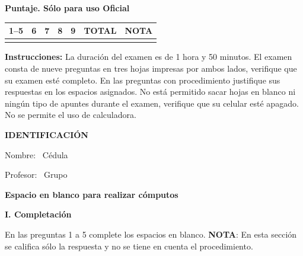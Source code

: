 \documentclass[11pt]{article}
\begin{document}
\examheader

\vspace{4pt}
\noindent
\begin{minipage}[t]{0.62\linewidth}
\textbf{Puntaje. Sólo para uso Oficial}\\[4pt]
\begin{tabular}{|c|c|c|c|c|c|c|}
\hline
1--5 & 6 & 7 & 8 & 9 & \textbf{TOTAL} & \textbf{NOTA} \\ \hline
 & & & & & & \\ \hline
\end{tabular}
\end{minipage}

\vspace{6pt}
\noindent\textbf{Instrucciones:} La duración del examen es de 1 hora y 50 minutos. El examen consta de nueve preguntas en tres hojas impresas por ambos lados, verifique que su examen esté completo. En las preguntas con procedimiento justifique sus respuestas en los espacios asignados. No está permitido sacar hojas en blanco ni ningún tipo de apuntes durante el examen, verifique que su celular esté apagado. No se permite el uso de calculadora.

\vspace{6pt}
\noindent\textbf{IDENTIFICACIÓN}

\vspace{8pt}
\noindent Nombre: \dotfill\ Cédula \dotfill

\vspace{4pt}
\noindent Profesor: \dotfill\ Grupo \dotfill

\vspace{6pt}
\begin{center}
\textbf{Espacio en blanco para realizar cómputos}
\end{center}

\newpage
\noindent\textbf{\large I. Completación}

\vspace{2pt}
\noindent En las preguntas 1 a 5 complete los espacios en blanco. \textbf{NOTA}: En esta sección se califica sólo la respuesta y no se tiene en cuenta el procedimiento.
\end{document}
